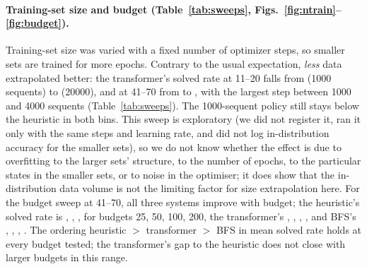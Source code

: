 \paragraph{Training-set size and budget (Table~\ref{tab:sweeps}, Figs.~\ref{fig:ntrain}--\ref{fig:budget}).} Training-set size was varied with a fixed number of optimizer steps, so smaller sets are trained for more epochs. Contrary to the usual expectation, \emph{less} data extrapolated better: the transformer's solved rate at 11--20 falls from  (1000 sequents) to  (20000), and at 41--70 from  to , with the largest step between 1000 and 4000 sequents (Table~\ref{tab:sweeps}). The 1000-sequent policy still stays below the heuristic in both bins. This sweep is exploratory (we did not register it, ran it only with the same steps and learning rate, and did not log in-distribution accuracy for the smaller sets), so we do not know whether the effect is due to overfitting to the larger sets' structure, to the number of epochs, to the particular states in the smaller sets, or to noise in the optimiser; it does show that the in-distribution data volume is not the limiting factor for size extrapolation here. For the budget sweep at 41--70, all three systems improve with budget; the heuristic's solved rate is , , ,  for budgets 25, 50, 100, 200, the transformer's , , , , and BFS's , , , . The ordering heuristic $>$ transformer $>$ BFS in mean solved rate holds at every budget tested; the transformer's gap to the heuristic does not close with larger budgets in this range.

